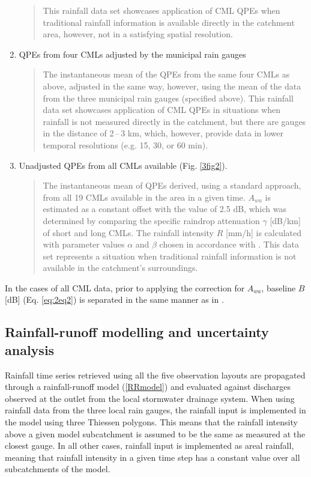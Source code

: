 \documentclass{ctuthesis}\usepackage[]{graphicx}\usepackage[]{color}
\begin{document}
\begin{enumerate}
\begin{quote}
                This rainfall data set showcases application of CML QPEs when traditional rainfall information is available directly in the catchment area, however, not in a satisfying spatial resolution.
                \end{quote}
        \item QPEs from four CMLs adjusted by the municipal rain gauges 
                \begin{quote}
                The instantaneous mean of the QPEs from the same four CMLs as above, adjusted in the same way, however, using the mean of the data from the three municipal rain gauges (specified above).
                This rainfall data set showcases application of CML QPEs in situations when rainfall is not measured directly in the catchment, but there are gauges in the distance of 2\,--\,3 km, which, however, provide data in lower temporal resolutions (e.g. 15, 30, or 60 min).
                \end{quote}
        \item Unadjusted QPEs from all CMLs available (Fig. \ref{3fig2}).
                \begin{quote}
                The instantaneous mean of QPEs derived, using a standard approach, from all 19 CMLs available in the area in a given time. $A_{wa}$ is estimated as a constant offset with the value of 2.5 dB, which was determined by comparing the specific raindrop attenuation $\gamma$ [dB/km] of short and long CMLs. The rainfall intensity $R$ [mm/h] is calculated with parameter values $\alpha$ and $\beta$ chosen in accordance with \cite{recommendation2005838}.
                This data set represents a situation when traditional rainfall information is not available in the catchment's surroundings.
                \end{quote}
\end{enumerate}

In the cases of all CML data, prior to applying the correction for $A_{wa}$, baseline $B$ [dB] (Eq. \ref{eq:2eq2}) is separated in the same manner as in \cite{fenclGaugeadjustedRainfallEstimates2017}.



\subsection{Rainfall-runoff modelling and uncertainty analysis}

Rainfall time series retrieved using all the five observation layouts are propagated through a rainfall-runoff model (\ref{RRmodel}) and evaluated against discharges observed at the outlet from the local stormwater drainage system. When using rainfall data from the three local rain gauges, the rainfall input is implemented in the model using three Thiessen polygons. This means that the rainfall intensity above a given model subcatchment is assumed to be the same as measured at the closest gauge. In all other cases, rainfall input is implemented as areal rainfall, meaning that rainfall intensity in a given time step has a constant value over all subcatchments of the model. 
\end{document}
